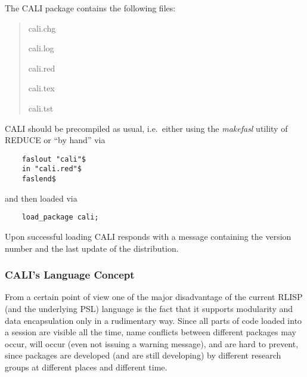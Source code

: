 The CALI package contains the following files:
\begin{quote}
cali.chg


cali.log


cali.red


cali.tex


cali.tst


\end{quote}

CALI should be precompiled as usual, i.e.\ either using the {\em
makefasl} utility of REDUCE or ``by hand'' via
\begin{verbatim}
    faslout "cali"$
    in "cali.red"$
    faslend$
\end{verbatim}
and then loaded via
\begin{verbatim}
    load_package cali;
\end{verbatim}
Upon successful loading CALI responds with a message containing the
version number and the last update of the distribution. 

\begin{center}
\end{center}

\subsubsection{CALI's Language Concept}

From a certain point of view one of the major disadvantage of the
current RLISP (and the underlying PSL) language is the fact
that it supports modularity and data encapsulation only in a
rudimentary way.  Since all parts of code loaded into a session are
visible all the time, name conflicts between different packages may
occur, will occur (even not issuing a warning message), and are hard
to prevent, since packages are developed (and are still developing)
by different research groups at different places and different time.

